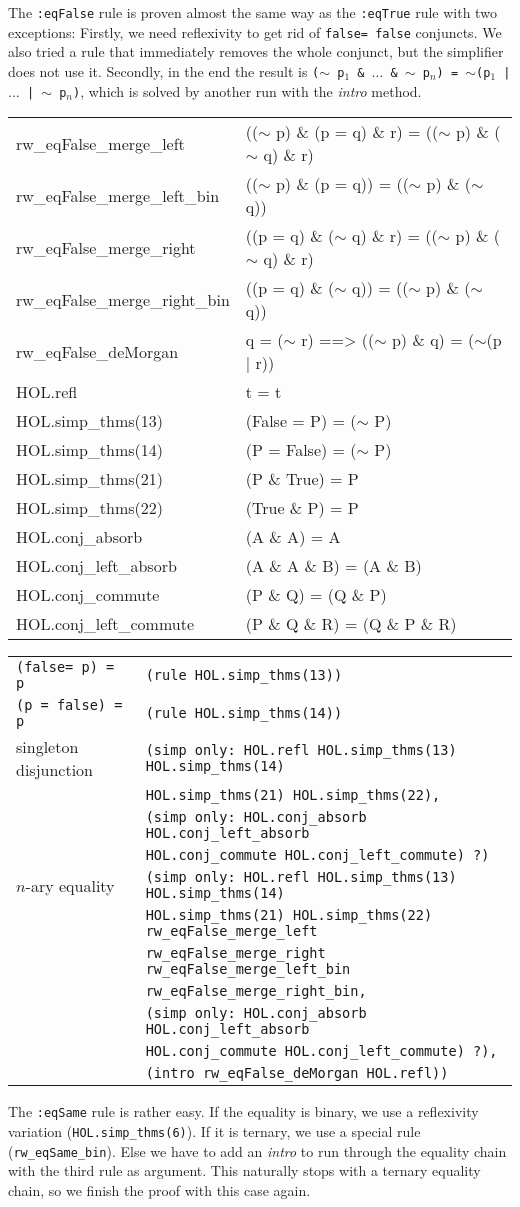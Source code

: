 \documentclass[10pt,a4paper]{article}
\newcommand{\ttt}{\texttt}
\newcommand{\negat}{\ensuremath{\sim}}
\newcommand{\nega}{\negat\xspace}
\newcommand{\false}{\ttt{false}\xspace}
\newenvironment{pt}[1]{\begin{center}\begin{tt}\begin{tabular}{#1}\hline}{\end{tabular}\end{tt}\end{center}}
\newcommand{\pl}[1]{#1 \\[1mm]}
\newcommand{\pll}[1]{#1 \\\hline}
\newenvironment{rt}{\begin{center}\begin{tabular}{|l l|}\hline}{\end{tabular}\end{center}}
\newcommand{\rl}[2]{\rm{#1} & \tt{#2} \\[1mm]}
\newcommand{\rll}[2]{\rm{#1} & \tt{#2} \\\hline}
\def\ind{\quad}
\begin{document}
The \ttt{:eqFalse} rule is proven almost the same way as the \ttt{:eqTrue} rule with two exceptions: Firstly, we need reflexivity to get rid of \mbox{\ttt{\false = \false}} conjuncts. We also tried a rule that immediately removes the whole conjunct, but the simplifier does not use it. Secondly, in the end the result is \mbox{\ttt{(\nega p$_1$ \& $\dots$ \& \nega p$_n$)}}\ttt{ = }\mbox{\ttt{\nega (p$_1$ | $\dots$ | \nega p$_n$)}}, which is solved by another run with the \emph{intro} method.
%
\begin{pt}{ll}
	\pl{rw\_eqFalse\_merge\_left & ((\nega p) \& (p = q) \& r) = ((\nega p) \& (\nega q) \& r)}
	\pl{rw\_eqFalse\_merge\_left\_bin & ((\nega p) \& (p = q)) = ((\nega p) \& (\nega q))}
	\pl{rw\_eqFalse\_merge\_right & ((p = q) \& (\nega q) \& r) = ((\nega p) \& (\nega q) \& r)}
	\pl{rw\_eqFalse\_merge\_right\_bin & ((p = q) \& (\nega q)) = ((\nega p) \& (\nega q))}
	\pl{rw\_eqFalse\_deMorgan & q = (\nega r) ==> ((\nega p) \& q) = (\nega (p | r))}
	\pl{HOL.refl & t = t}
	\pl{HOL.simp\_thms(13) & (False = P) = (\nega P)}
	\pl{HOL.simp\_thms(14) & (P = False) = (\nega P)}
	\pl{HOL.simp\_thms(21) & (P \& True) = P}
	\pl{HOL.simp\_thms(22) & (True \& P) = P}
	\pl{HOL.conj\_absorb & (A \& A) = A}
	\pl{HOL.conj\_left\_absorb & (A \& A \& B) = (A \& B)}
	\pl{HOL.conj\_commute & (P \& Q) = (Q \& P)}
	\pll{HOL.conj\_left\_commute & (P \& Q \& R) = (Q \& P \& R)}
\end{pt}
%
\begin{rt}
	\rl{\ttt{(\false = p) = p}}{(rule HOL.simp\_thms(13))}
	\rl{\ttt{(p = \false) = p}}{(rule HOL.simp\_thms(14))}
	\rl{singleton disjunction}{(simp only:~HOL.refl HOL.simp\_thms(13) HOL.simp\_thms(14)}
		\rl{}{\ind HOL.simp\_thms(21) HOL.simp\_thms(22),}
		\rl{}{(simp only:~HOL.conj\_absorb HOL.conj\_left\_absorb}
		\rl{}{\ind HOL.conj\_commute HOL.conj\_left\_commute) ?)}
	\rl{$n$-ary equality}{(simp only:~HOL.refl HOL.simp\_thms(13) HOL.simp\_thms(14)}
		\rl{}{\ind HOL.simp\_thms(21) HOL.simp\_thms(22) rw\_eqFalse\_merge\_left}
		\rl{}{\ind rw\_eqFalse\_merge\_right rw\_eqFalse\_merge\_left\_bin}
		\rl{}{\ind rw\_eqFalse\_merge\_right\_bin,}
		\rl{}{(simp only:~HOL.conj\_absorb HOL.conj\_left\_absorb}
		\rl{}{\ind HOL.conj\_commute HOL.conj\_left\_commute) ?),}
		\rll{}{(intro rw\_eqFalse\_deMorgan HOL.refl))}
\end{rt}

The \ttt{:eqSame} rule is rather easy. If the equality is binary, we use a reflexivity variation (\ttt{HOL.simp\_thms(6)}). If it is ternary, we use a special rule (\ttt{rw\_eqSame\_bin}). Else we have to add an \emph{intro} to run through the equality chain with the third rule as argument. This naturally stops with a ternary equality chain, so we finish the proof with this case again.
\end{document}
